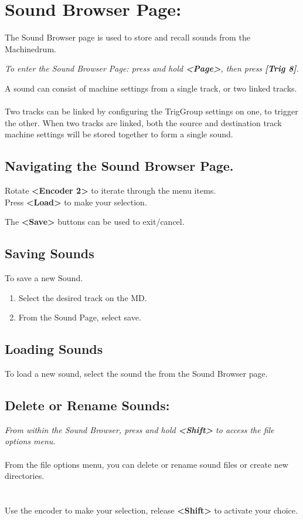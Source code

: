 \chapter{Sound Browser Page:}
The Sound Browser page is used to store and recall sounds from the Machinedrum.

\textit{To enter the Sound Browser Page: press and hold \textbf{<Page>}, then press \textbf{[Trig 8]}.}

A sound can consist of machine settings from a single track, or two linked tracks.\\
\\
Two tracks can be linked by configuring the TrigGroup settings on one, to trigger the other. When two tracks are linked, both the source and destination track machine settings will be stored together to form a single sound.


 \section{Navigating the Sound Browser Page.}
Rotate \textbf{<Encoder 2>} to iterate through the menu items.\\
Press \textbf{<Load>} to make your selection.

The \textbf{<Save>} buttons can be used to exit/cancel.
 
 \section{Saving Sounds}
 To save a new Sound. 
\begin{enumerate}
 \item Select the desired track on the MD.
 \item From the Sound Page, select save.
\end{enumerate}
\section{Loading Sounds}
To load a new sound, select the sound the from the Sound Browser page.
\newpage
\section{Delete or Rename Sounds:}
\textit{From within the Sound Browser, press and hold \textbf{<Shift>} to access the file options menu.}\\\\
From the file options menu, you can delete or rename sound files or create new directories.\\\\\\
Use the encoder to make your selection, release \textbf{<Shift>} to activate your choice.
